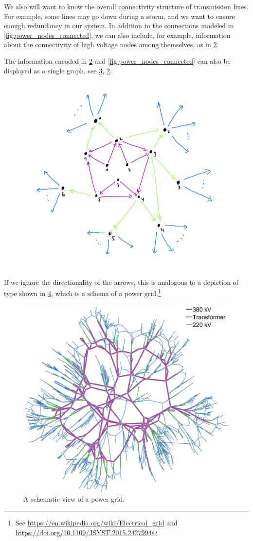 \begin{figure}[h!]
\centering
{}
 \caption{}
\label{fig:power_paths}
\end{figure}


We also will want to know the overall connectivity structure of transmission lines. For example, some lines may go down during a storm, and we want to ensure enough redundancy in our system. In addition to the connections modeled in \cref{fig:power_nodes_connected}, we can also include, for example, information about the connectivity of high voltage nodes among themselves, as in \cref{fig:power_internodal}. 

\begin{figure}[h!]
\centering
 \caption{}
\label{fig:power_internodal}
\end{figure}
The information encoded in \cref{fig:power_internodal} and \cref{fig:power_nodes_connected} can also be displayed as a single graph, see \cref{fig:power_graph},
\cref{fig:power_internodal}. 
\begin{figure}[h!]
\centering
 \includegraphics[width=0.5\linewidth]{pics/dist_net_6.png} 
 \caption{}
\label{fig:power_graph}
\end{figure}
If we ignore the directionality of the arrows, this is analogous to a depiction of type shown in \cref{fig:power_schema}, which is a schema of a power grid.\footnote{See \url{https://en.wikipedia.org/wiki/Electrical_grid} and \url{https://doi.org/10.1109/JSYST.2015.2427994}} 

\begin{figure}[h!]
\centering
 \includegraphics[width=0.5\linewidth]{pics/power_dist_network.png}
 \caption{A schematic view of a power grid.}
\label{fig:power_schema}
\end{figure}




